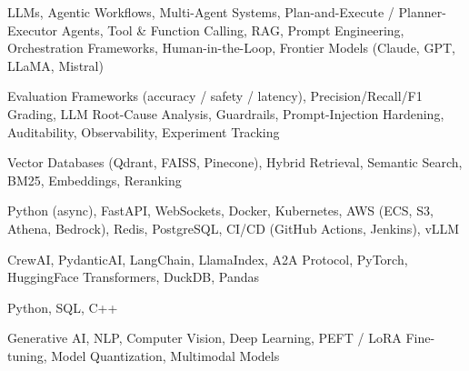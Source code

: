 \documentclass[letter,10pt]{article}
\begin{document}
 LLMs, Agentic Workflows, Multi-Agent Systems, Plan-and-Execute / Planner-Executor Agents, Tool \& Function Calling, RAG, Prompt Engineering, Orchestration Frameworks, Human-in-the-Loop, Frontier Models (Claude, GPT, LLaMA, Mistral)\par\vspace{2pt}

 Evaluation Frameworks (accuracy / safety / latency), Precision/Recall/F1 Grading, LLM Root-Cause Analysis, Guardrails, Prompt-Injection Hardening, Auditability, Observability, Experiment Tracking\par\vspace{2pt}

 Vector Databases (Qdrant, FAISS, Pinecone), Hybrid Retrieval, Semantic Search, BM25, Embeddings, Reranking\par\vspace{2pt}

 Python (async), FastAPI, WebSockets, Docker, Kubernetes, AWS (ECS, S3, Athena, Bedrock), Redis, PostgreSQL, CI/CD (GitHub Actions, Jenkins), vLLM\par\vspace{2pt}

 CrewAI, PydanticAI, LangChain, LlamaIndex, A2A Protocol, PyTorch, HuggingFace Transformers, DuckDB, Pandas\par\vspace{2pt}

 Python, SQL, C++\par\vspace{2pt}

 Generative AI, NLP, Computer Vision, Deep Learning, PEFT / LoRA Fine-tuning, Model Quantization, Multimodal Models
\end{document}
